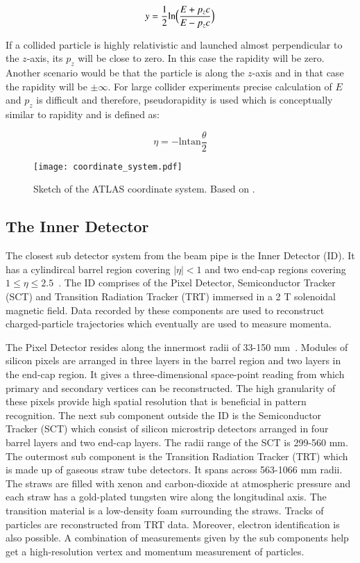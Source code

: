 \begin{equation*}
    y = \frac{1}{2}\text{ln} \Bigl(\frac{E+p_zc}{E-p_zc}\Bigl)
\end{equation*}


If a collided particle is highly relativistic and launched almost perpendicular to the $z$-axis, its $p_z$ will be close to zero. In this
case the rapidity will be zero. Another scenario would be that the particle is along the $z$-axis and in that case the rapidity will be $\pm \infty$. For large
collider experiments precise calculation of $E$ and $p_z$ is difficult and therefore, pseudorapidity is used which is conceptually similar to rapidity and is 
defined as:

\begin{equation*}
    \eta = -\text{ln} \text{tan}\frac{\theta}{2}
\end{equation*}

\begin{figure}[htbp]
    \centering
    \texttt{[image: coordinate\_system.pdf]}
    \caption[Sketch of the ATLAS coordinate system]{Sketch of the ATLAS coordinate system. Based on \cite{coordinatesys}.}%
    \label{fig:coordinatesys}
\end{figure}

\subsection{The Inner Detector}
The closest sub detector system from the beam pipe is the Inner Detector (ID). It has a cylindircal barrel region covering $|\eta|<1$ and two end-cap regions covering 
$1 \leq \eta \leq 2.5$~\cite{BARBERIS2000331}. The ID comprises of the Pixel Detector, Semiconductor Tracker (SCT) and Transition Radiation Tracker (TRT) immersed in a 2 T solenoidal 
magnetic field. Data recorded by these components are used to reconstruct charged-particle trajectories which eventually are used to measure momenta. 

The Pixel Detector resides along the innermost radii of 33-150 mm~\cite{Aaboud_2017}. Modules of silicon pixels are arranged in three layers in the barrel region and two layers in the end-cap region. 
It gives a three-dimensional space-point reading from which primary and secondary vertices can be reconstructed. The high granularity of these pixels provide high spatial 
resolution that is beneficial in pattern recognition. The next sub component outside the ID is the Semiconductor Tracker (SCT) which consist of silicon microstrip detectors 
arranged in four barrel layers and two end-cap layers. The radii range of the SCT is 299-560 mm. The outermost sub component is the Transition Radiation Tracker (TRT) which 
is made up of gaseous straw tube detectors. It spans across 563-1066 mm radii. The straws are filled with xenon and carbon-dioxide at atmospheric pressure and each straw
has a gold-plated tungsten wire along the longitudinal axis. The transition material is a low-density foam surrounding the straws. Tracks of particles are reconstructed from TRT
data. Moreover, electron identification is also possible. A combination of measurements given by the sub components help get a high-resolution vertex and momentum measurement of
particles. 

